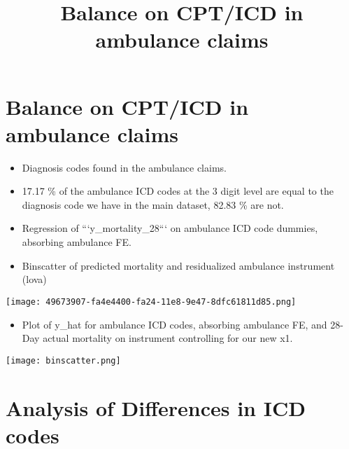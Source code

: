 \documentclass{article}
\begin{document}
\title{Balance on CPT/ICD in ambulance claims}
\section{Balance on CPT/ICD in ambulance claims}

\begin{itemize}
    \item Diagnosis codes found in the ambulance claims.
    \item 17.17 \% of the ambulance ICD codes at the 3 digit level are equal to the diagnosis code we have in the main dataset, 82.83 \% are not.
    \item Regression of ```y\_mortality\_28``` on ambulance ICD code dummies, absorbing ambulance FE.
    \item Binscatter of predicted mortality and residualized ambulance instrument (lova)
    \end{itemize}
    \texttt{[image: 49673907-fa4e4400-fa24-11e8-9e47-8dfc61811d85.png]}
\begin{itemize}
    \item Plot of y\_hat for ambulance ICD codes, absorbing ambulance FE, and 28-Day actual mortality on instrument controlling for our new x1.
    \end{itemize}
    \texttt{[image: binscatter.png]}
    \newpage
\section{Analysis of Differences in ICD codes}
\end{document}
